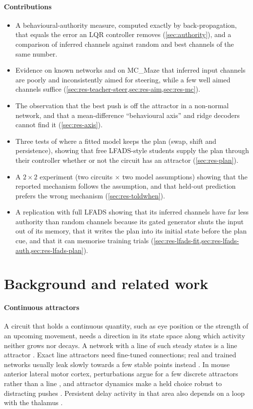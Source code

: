 \documentclass[11pt,a4paper]{article}
\begin{document}
\paragraph{Contributions}
\begin{itemize}
  \item A behavioural-authority measure, computed exactly by back-propagation, that equals the error an LQR controller removes (\cref{sec:authority}), and a comparison of inferred channels against random and best channels of the same number.
  \item Evidence on known networks and on MC\_Maze that inferred input channels are poorly and inconsistently aimed for steering, while a few well aimed channels suffice (\cref{sec:res-teacher-steer,sec:res-aim,sec:res-mc}).
  \item The observation that the best push is off the attractor in a non-normal network, and that a mean-difference ``behavioural axis'' and ridge decoders cannot find it (\cref{sec:res-axis}).
  \item Three tests of where a fitted model keeps the plan (swap, shift and persistence), showing that free LFADS-style students supply the plan through their controller whether or not the circuit has an attractor (\cref{sec:res-plan}).
  \item A $2\times2$ experiment (two circuits $\times$ two model assumptions) showing that the reported mechanism follows the assumption, and that held-out prediction prefers the wrong mechanism (\cref{sec:res-toldwhen}).
  \item A replication with full LFADS showing that its inferred channels have far less authority than random channels because its gated generator shuts the input out of its memory, that it writes the plan into its initial state before the plan cue, and that it can memorise training trials (\cref{sec:res-lfads-fit,sec:res-lfads-auth,sec:res-lfads-plan}).
\end{itemize}

\section{Background and related work}\label{sec:background}

\paragraph{Continuous attractors} A circuit that holds a continuous quantity, such as eye position or the strength of an upcoming movement, needs a direction in its state space along which activity neither grows nor decays. A network with a line of such steady states is a line attractor \citep{seung1996,khona2022}. Exact line attractors need fine-tuned connections; real and trained networks usually leak slowly towards a few stable points instead \citep{brody2003}. In mouse anterior lateral motor cortex, perturbations argue for a few discrete attractors rather than a line \citep{inagaki2019}, and attractor dynamics make a held choice robust to distracting pushes \citep{finkelstein2021}. Persistent delay activity in that area also depends on a loop with the thalamus \citep{guo2017}.
\end{document}

